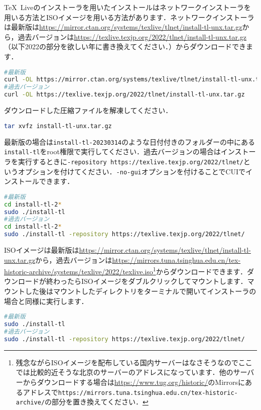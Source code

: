 \TeX\ Liveのインストーラを用いたインストールはネットワークインストーラを用いる方法とISOイメージを用いる方法があります．ネットワークインストーラは最新版は\url{https://mirror.ctan.org/systems/texlive/tlnet/install-tl-unx.tar.gz}から，過去バージョンは\url{https://texlive.texjp.org/2022/tlnet/install-tl-unx.tar.gz}（以下2022の部分を欲しい年に書き換えてください．）からダウンロードできます．
\begin{lstlisting}[language=bash]
#最新版
curl -OL https://mirror.ctan.org/systems/texlive/tlnet/install-tl-unx.tar.gz
#過去バージョン
curl -OL https://texlive.texjp.org/2022/tlnet/install-tl-unx.tar.gz
\end{lstlisting}
ダウンロードした圧縮ファイルを解凍してください．
\begin{lstlisting}[language=bash]
tar xvfz install-tl-unx.tar.gz
\end{lstlisting}
最新版の場合は\texttt{install-tl-20230314}のような日付付きのフォルダーの中にある\texttt{install-tl}をroot権限で実行してください．過去バージョンの場合はインストーラを実行するときに\texttt{-repository https://texlive.texjp.org/2022/tlnet/}というオプションを付けてください．\texttt{-no-gui}オプションを付けることでCUIでインストールできます．
\begin{lstlisting}[language=bash]
#最新版
cd install-tl-2*
sudo ./install-tl
#過去バージョン
cd install-tl-2*
sudo ./install-tl -repository https://texlive.texjp.org/2022/tlnet/
\end{lstlisting}
ISOイメージは最新版は\url{https://mirror.ctan.org/systems/texlive/tlnet/install-tl-unx.tar.gz}から，過去バージョンは\url{https://mirrors.tuna.tsinghua.edu.cn/tex-historic-archive/systems/texlive/2022/texlive.iso}\footnote{残念ながらISOイメージを配布している国内サーバーはなさそうなのでここでは比較的近そうな北京のサーバーのアドレスになっています．他のサーバーからダウンロードする場合は\url{https://www.tug.org/historic/}のMirrorsにあるアドレスで\texttt{https://mirrors.tuna.tsinghua.edu.cn/tex-historic-archive/}の部分を置き換えてください．}からダウンロードできます．ダウンロードが終わったらISOイメージをダブルクリックしてマウントします．マウントした後はマウントしたディレクトリをターミナルで開いてインストーラの場合と同様に実行します．
\begin{lstlisting}[language=bash]
#最新版
sudo ./install-tl
#過去バージョン
sudo ./install-tl -repository https://texlive.texjp.org/2022/tlnet/
\end{lstlisting}

